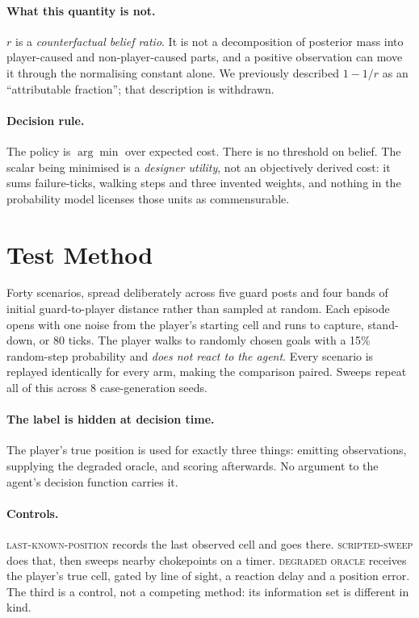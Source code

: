 \documentclass{article}
\begin{document}
\paragraph{What this quantity is not.}
$r$ is a \emph{counterfactual belief ratio}. It is not a decomposition of posterior mass into
player-caused and non-player-caused parts, and a positive observation can move it through the
normalising constant alone. We previously described $1 - 1/r$ as an ``attributable fraction'';
that description is withdrawn.

\paragraph{Decision rule.}
The policy is $\arg\min$ over expected cost. There is no threshold on belief. The scalar being
minimised is a \emph{designer utility}, not an objectively derived cost: it sums failure-ticks,
walking steps and three invented weights, and nothing in the probability model licenses those
units as commensurable.

\section{Test Method}
\label{sec:test}

Forty scenarios, spread deliberately across five guard posts and four bands of initial
guard-to-player distance rather than sampled at random. Each episode opens with one noise from
the player's starting cell and runs to capture, stand-down, or 80 ticks. The player walks to
randomly chosen goals with a 15\% random-step probability and \emph{does not react to the
agent}. Every scenario is replayed identically for every arm, making the comparison paired.
Sweeps repeat all of this across 8 case-generation seeds.

\paragraph{The label is hidden at decision time.}
The player's true position is used for exactly three things: emitting observations, supplying
the degraded oracle, and scoring afterwards. No argument to the agent's decision function
carries it.

\paragraph{Controls.}
\textsc{last-known-position} records the last observed cell and goes there.
\textsc{scripted-sweep} does that, then sweeps nearby chokepoints on a timer. \textsc{degraded
oracle} receives the player's true cell, gated by line of sight, a reaction delay and a position
error. The third is a control, not a competing method: its information set is different in kind.
\end{document}
